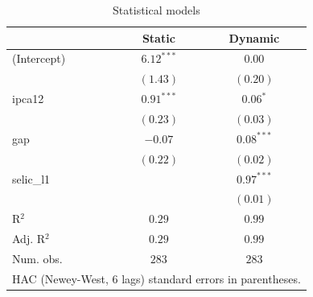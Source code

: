 
\begin{table}
\begin{center}
\begin{tabular}{l c c}
\hline
 & Static & Dynamic \\
\hline
(Intercept) & $6.12^{***}$ & $0.00$       \\
            & $(1.43)$     & $(0.20)$     \\
ipca12      & $0.91^{***}$ & $0.06^{*}$   \\
            & $(0.23)$     & $(0.03)$     \\
gap         & $-0.07$      & $0.08^{***}$ \\
            & $(0.22)$     & $(0.02)$     \\
selic\_l1   &              & $0.97^{***}$ \\
            &              & $(0.01)$     \\
\hline
R$^2$       & $0.29$       & $0.99$       \\
Adj. R$^2$  & $0.29$       & $0.99$       \\
Num. obs.   & $283$        & $283$        \\
\hline
\multicolumn{3}{l}{\scriptsize{HAC (Newey-West, 6 lags) standard errors in parentheses.}}
\end{tabular}
\caption{Statistical models}
\label{table:coefficients}
\end{center}
\end{table}
